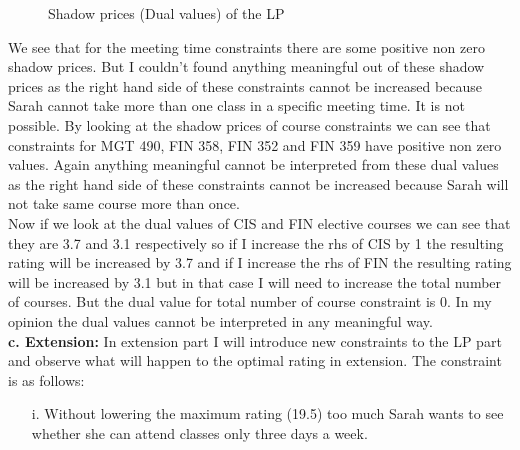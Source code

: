 \documentclass[paper=letter, fontsize=11pt]{scrartcl} %
\begin{document}
\begin{figure}[H]
  
  \centering
    \caption{Shadow prices (Dual values) of the LP}
\end{figure}
We see that for the meeting time constraints there are some positive non zero shadow prices. But I couldn't found anything meaningful out of these shadow prices as the right hand side of these constraints cannot be increased because Sarah cannot take more than one class in a specific meeting time. It is not possible. By looking at the shadow prices of course constraints we can see that constraints for MGT 490, FIN 358, FIN 352 and FIN 359 have positive non zero values. Again anything meaningful cannot be interpreted from these dual values as the right hand side of these constraints cannot be increased because Sarah will not take same course more than once.\\
Now if we look at the dual values of CIS and FIN elective courses we can see that they are 3.7 and 3.1 respectively so if I increase the rhs of CIS by 1 the resulting rating will be increased by 3.7 and if I increase the rhs of FIN the resulting rating will be increased by 3.1 but in that case I will need to increase the total number of courses. But the dual value for total number of course constraint is 0. In my opinion the dual values cannot be interpreted in any meaningful way.\\  

 \normalsize \textbf{c. Extension:}
In extension part I will introduce new constraints to the LP part and observe what will happen to the optimal rating in extension. The constraint is as follows:
\begin{enumerate}[align=left,style=nextline,leftmargin=1.5cm,labelsep=\parindent,font=\normalfont]
\item[i.]  Without lowering the maximum rating (19.5) too much Sarah wants to see whether she can attend classes only three days a week. 
\end{enumerate}
\end{document}
